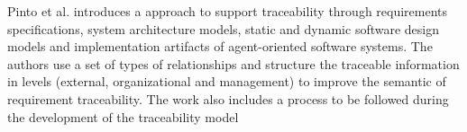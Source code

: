 Pinto et al. \cite{pinto_process_2005} introduces a approach to support traceability through requirements specifications, system architecture models, static and dynamic software design models and implementation artifacts of agent-oriented software systems.
The authors use a set of types of relationships and structure the traceable information in levels (external, organizational and management) to improve the semantic of requirement traceability.
The work also includes a process to be followed during the development of the traceability model
